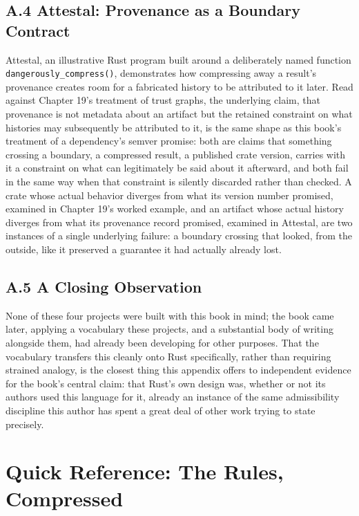 \documentclass[11pt]{book}
\begin{document}
\section*{A.4 Attestal: Provenance as a Boundary Contract}

Attestal, an illustrative Rust program built around a deliberately named function \texttt{dangerously\_compress()}, demonstrates how compressing away a result's provenance creates room for a fabricated history to be attributed to it later. Read against Chapter 19's treatment of trust graphs, the underlying claim, that provenance is not metadata about an artifact but the retained constraint on what histories may subsequently be attributed to it, is the same shape as this book's treatment of a dependency's semver promise: both are claims that something crossing a boundary, a compressed result, a published crate version, carries with it a constraint on what can legitimately be said about it afterward, and both fail in the same way when that constraint is silently discarded rather than checked. A crate whose actual behavior diverges from what its version number promised, examined in Chapter 19's worked example, and an artifact whose actual history diverges from what its provenance record promised, examined in Attestal, are two instances of a single underlying failure: a boundary crossing that looked, from the outside, like it preserved a guarantee it had actually already lost.

\section*{A.5 A Closing Observation}

None of these four projects were built with this book in mind; the book came later, applying a vocabulary these projects, and a substantial body of writing alongside them, had already been developing for other purposes. That the vocabulary transfers this cleanly onto Rust specifically, rather than requiring strained analogy, is the closest thing this appendix offers to independent evidence for the book's central claim: that Rust's own design was, whether or not its authors used this language for it, already an instance of the same admissibility discipline this author has spent a great deal of other work trying to state precisely.

\clearpage

\chapter[Quick Reference, Compressed]{Quick Reference: The Rules, Compressed}
\end{document}
